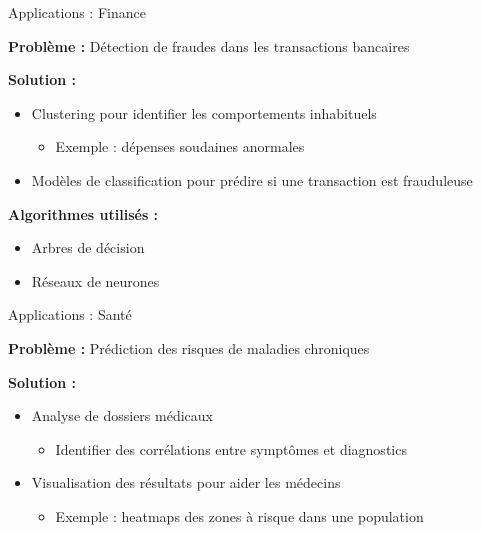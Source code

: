 \begin{frame}{Applications : Finance}

\textbf{Problème :} Détection de fraudes dans les transactions bancaires

\vspace{0.3cm}

\textbf{Solution :}
\begin{itemize}
    \item<+-> Clustering pour identifier les comportements inhabituels
        \begin{itemize}
            \item Exemple : dépenses soudaines anormales
        \end{itemize}
    \item<+-> Modèles de classification pour prédire si une transaction est frauduleuse
\end{itemize}

\vspace{0.3cm}

\textbf{Algorithmes utilisés :}
\begin{itemize}
    \item Arbres de décision
    \item Réseaux de neurones
\end{itemize}

\end{frame}

\begin{frame}{Applications : Santé}

\textbf{Problème :} Prédiction des risques de maladies chroniques

\vspace{0.3cm}

\textbf{Solution :}
\begin{itemize}
    \item<+-> Analyse de dossiers médicaux
        \begin{itemize}
            \item Identifier des corrélations entre symptômes et diagnostics
        \end{itemize}
    \item<+-> Visualisation des résultats pour aider les médecins
        \begin{itemize}
            \item Exemple : heatmaps des zones à risque dans une population
        \end{itemize}
\end{itemize}

\end{frame}


